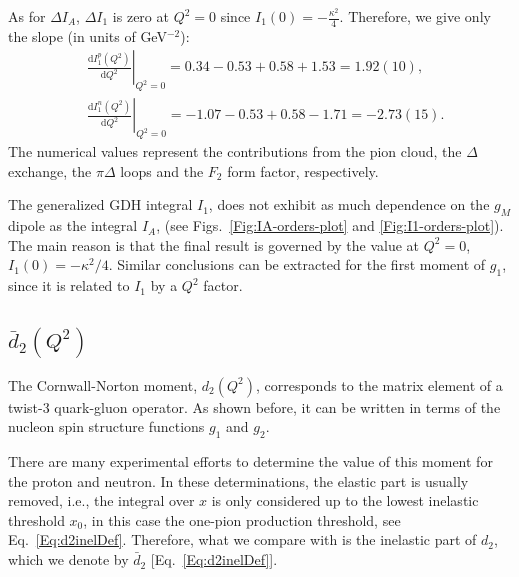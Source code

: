 \documentclass[twocolumn,prc,showpacs,nofootinbib,preprintnumbers,amsmath,amssymb,superscriptaddress]{revtex4-1}
\def\dd{\mathrm{d}}
\begin{document}
As for $\Delta I_A$, $\Delta I_1$ is zero at $Q^2=0$ since $I_1 (0) = - \frac{\kappa^2}{4}$. Therefore, we give only the slope (in units of GeV$^{-2}$):
\begin{align}
&\left.\frac{\dd I_1^p (Q^2)}{\dd Q^2}\right|_{Q^2=0}= 0.34 - 0.53 + 0.58 +1.53 =1.92(10) ,\\
&\left.\frac{\dd I_1^n (Q^2)}{\dd Q^2}\right|_{Q^2=0}= -1.07 - 0.53 + 0.58 -1.71=-2.73(15) .
\end{align}
The numerical values represent the contributions from the pion cloud, the $\Delta$ exchange, the $\pi \Delta$ loops and the $F_2$ form factor, respectively.



The generalized GDH integral $I_1$, does not exhibit as much dependence on the $g_M$ dipole as the integral  $I_A$, (see Figs.~\ref{Fig:IA-orders-plot} and \ref{Fig:I1-orders-plot}). 
The main reason is that the final result is governed by the value at $Q^2=0$, $I_1(0)=-\kappa^2/4$. 
Similar conclusions can be extracted for the first moment of $g_1$, since it is related to $I_1$ by a $Q^2$ factor.


\subsection{$\bar{d}_2(Q^2)$}

The Cornwall-Norton moment, $d_2(Q^2)$, corresponds to the matrix element of a twist-3 quark-gluon operator. 
As shown before, it can be written in terms of the nucleon spin structure functions $g_1$ and $g_2$.
%


There are many experimental efforts to determine the value of this moment for the proton and neutron.
In these determinations, the elastic part is usually removed, i.e., the integral over $x$ is only considered up to the lowest inelastic threshold $x_0$, in this case the one-pion production threshold, see Eq.~\eqref{Eq:d2inelDef}.
Therefore, what we compare with is the inelastic part of $d_2$, which we denote by  $\bar{d}_2$ [Eq.~\eqref{Eq:d2inelDef}].
\end{document}
